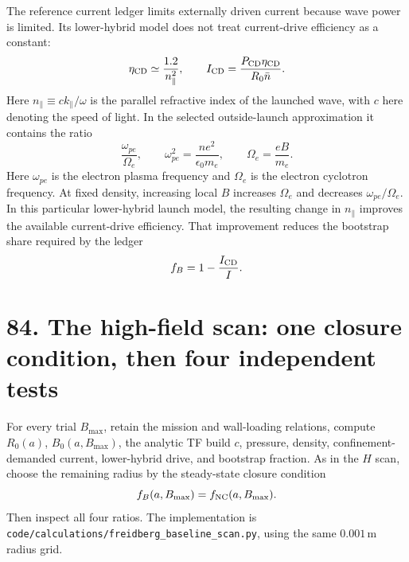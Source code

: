\documentclass[11pt]{article}
\begin{document}
The reference current ledger limits externally driven current because wave power is
limited. Its lower-hybrid model does not treat current-drive efficiency as a constant:
\begin{equation}
 \eta_{\rm CD}\simeq\frac{1.2}{n_\parallel^2},\qquad
 I_{\rm CD}=\frac{P_{\rm CD}\eta_{\rm CD}}{R_0\bar n}.
 \label{eq:high-field-current-drive}
\end{equation}
Here $n_\parallel\equiv ck_\parallel/\omega$ is the parallel refractive index of the
launched wave, with $c$ here denoting the speed of light. In the selected outside-launch approximation it contains the ratio
\begin{equation}
 \frac{\omega_{pe}}{\Omega_e},\qquad
 \omega_{pe}^2=\frac{ne^2}{\epsilon_0m_e},\qquad
 \Omega_e=\frac{eB}{m_e}.
 \label{eq:high-field-frequency-ratio}
\end{equation}
Here $\omega_{pe}$ is the electron plasma frequency and $\Omega_e$ is the electron cyclotron frequency. At fixed density, increasing local $B$ increases
$\Omega_e$ and decreases $\omega_{pe}/\Omega_e$. In this particular lower-hybrid
launch model, the resulting change in $n_\parallel$ improves the available
current-drive efficiency. That improvement reduces the bootstrap share required by
the ledger
\[
 f_B=1-\frac{I_{\rm CD}}{I}.
\]


\section*{84. The high-field scan: one closure condition, then four independent tests}

For every trial $B_{\max}$, retain the mission and wall-loading relations, compute
$R_0(a)$, $B_0(a,B_{\max})$, the analytic TF build $c$, pressure, density,
confinement-demanded current, lower-hybrid drive, and bootstrap fraction. As in the
$H$ scan, choose the remaining radius by the steady-state closure condition
\begin{equation}
 f_B(a,B_{\max})=f_{\rm NC}(a,B_{\max}).
 \label{eq:bmax-bootstrap-match}
\end{equation}
Then inspect all four ratios. The implementation is
\texttt{code/calculations/freidberg\_baseline\_scan.py}, using the same
$0.001\,\mathrm m$ radius grid.
\end{document}
